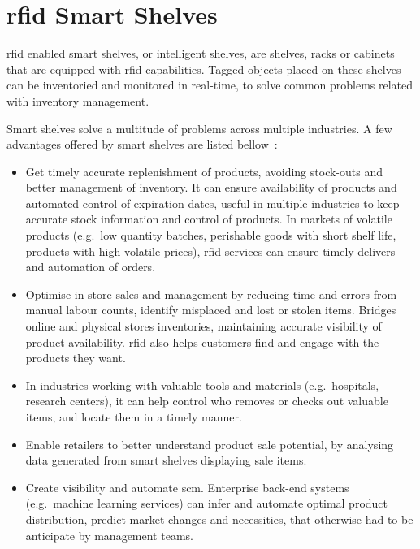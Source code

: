 \chapter{\acs{rfid} Smart Shelves} \label{sec:smartshelves}

\ac{rfid} enabled smart shelves, or intelligent shelves, are shelves, racks or cabinets that are equipped with \ac{rfid} capabilities.
Tagged objects placed on these shelves can be inventoried and monitored in real-time, to solve common problems related with inventory management.

Smart shelves solve a multitude of problems across multiple industries. A few advantages offered by smart shelves are listed bellow~\cite{lahiriRFIDSourcebook2005, WhatYouNeed, FutureRetailShopping, SmartShelvesKey2019}:

\begin{itemize}
    \item Get timely accurate replenishment of products, avoiding stock-outs and better management of inventory. It can ensure availability of products and automated control of expiration dates, useful in multiple industries to keep accurate stock information and control of products. In markets of volatile products (e.g.\ low quantity batches, perishable goods with short shelf life, products with high volatile prices), \ac{rfid} services can ensure timely delivers and automation of orders.
    \item Optimise in-store sales and management by reducing time and errors from manual labour counts, identify misplaced and lost or stolen items. Bridges online and physical stores inventories, maintaining accurate visibility of product availability. \ac{rfid} also helps customers find and engage with the products they want.
    \item In industries working with valuable tools and materials (e.g.\ hospitals, research centers), it can help control who removes or checks out valuable items, and locate them in a timely manner.
    \item Enable retailers to better understand product sale potential, by analysing data generated from smart shelves displaying sale items.
    \item Create visibility and automate \ac{scm}. Enterprise back-end systems (e.g.\ machine learning services) can infer and automate optimal product distribution, predict market changes and necessities, that otherwise had to be anticipate by management teams.
\end{itemize}


